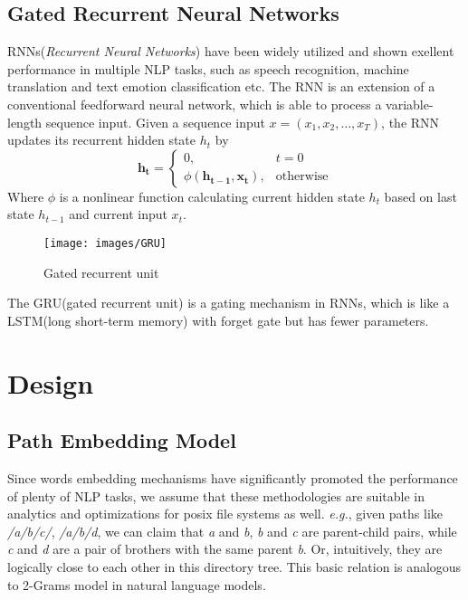 \documentclass[conference]{IEEEtran}
\begin{document}
\subsection{Gated Recurrent Neural Networks}
RNNs(\textit{Recurrent Neural Networks}) have been widely utilized and shown exellent performance in multiple NLP tasks,
such as speech recognition, machine translation and text emotion classification etc.
The RNN is an extension of a conventional feedforward neural network, which is able to process a variable-length sequence input.
Given a sequence input $x = (x_1, x_2, \dots, x_T)$, the RNN updates its recurrent hidden state $h_t$ by
\begin{equation}
    \mathbf{h_t}=
        \begin{cases}
            0, &t=0 \\
            \phi(\mathbf{h_{t-1}, \mathbf{x_t}}), &\text{otherwise}
        \end{cases}
\end{equation}
Where $\phi$ is a nonlinear function calculating current hidden state $h_t$ based on last state $h_{t-1}$ and current input $x_t$.

\begin{figure}
\centering
\texttt{[image: images/GRU]}
\caption{Gated recurrent unit}
\end{figure}
The GRU(gated recurrent unit)\cite{GRU} is a gating mechanism in RNNs, 
which is like a LSTM(long short-term memory)\cite{LSTM} with forget gate but has fewer parameters.


\section{Design}
\subsection{Path Embedding Model}
Since words embedding mechanisms have significantly promoted the performance of plenty of NLP tasks, 
we assume that these methodologies are suitable in analytics and optimizations for posix file systems as well.
\textit{e.g.}, given paths like \textit{/a/b/c/}, \textit{/a/b/d}, we can claim that \textit{a} and \textit{b},
\textit{b} and \textit{c} are parent-child pairs, while \textit{c} and \textit{d} are a pair of brothers with the same parent \textit{b}.
Or, intuitively, they are logically close to each other in this directory tree. 
This basic relation is analogous to 2-Grams model in natural language models.
\end{document}
